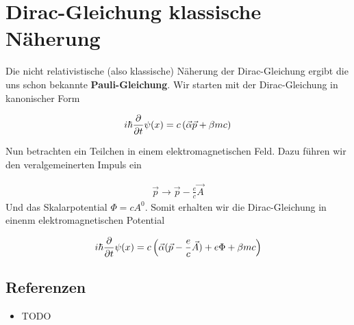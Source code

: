 
\usepackage{amsmath} 





\section*{Dirac-Gleichung klassische Näherung}

Die nicht relativistische (also klassische) Näherung der Dirac-Gleichung ergibt die uns schon bekannte \textbf{Pauli-Gleichung}. Wir starten mit der Dirac-Gleichung in kanonischer Form

\begin{align}
  \label{eq:1}
  i\hbar\pdiff_t \psi(x) = c\left(\vec \alpha \vec p +\beta mc  \right)
\end{align}

Nun betrachten ein Teilchen in einem elektromagnetischen Feld. Dazu führen wir den veralgemeinerten Impuls ein

\begin{align}
  \label{eq:2}
  \vec p \rightarrow \vec p - \frac{e}{c}\vec A
\end{align}
Und das Skalarpotential \(\Phi=cA^{0}\). Somit erhalten wir die Dirac-Gleichung in einenm elektromagnetischen Potential

\begin{align}
  \label{eq:3}
  i\hbar\pdiff_t \psi(x) = c\left(\vec \alpha (\vec p - \frac{e}{c}\vec A) + e\Phi   +\beta mc  \right)
\end{align}






\subsection*{Referenzen}
\begin{itemize}
\item TODO
\end{itemize}


